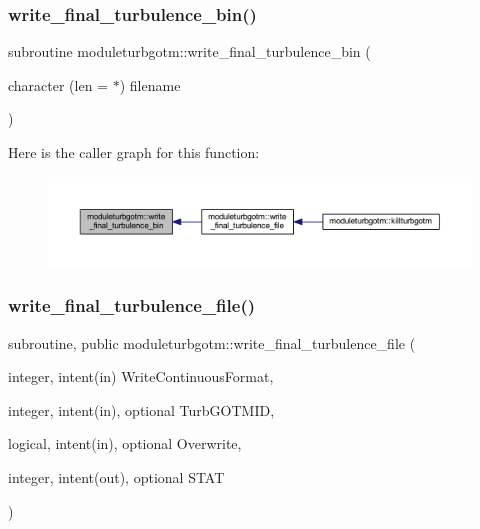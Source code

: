 \subsubsection{\texorpdfstring{write\+\_\+final\+\_\+turbulence\+\_\+bin()}{write\_final\_turbulence\_bin()}}
{\footnotesize\ttfamily subroutine moduleturbgotm\+::write\+\_\+final\+\_\+turbulence\+\_\+bin (\begin{DoxyParamCaption}\item[{character (len = $\ast$)}]{filename }\end{DoxyParamCaption})\hspace{0.3cm}{\ttfamily [private]}}

Here is the caller graph for this function\+:\nopagebreak
\begin{figure}[H]
\begin{center}
\leavevmode
\includegraphics[width=350pt]{namespacemoduleturbgotm_a471003d8ec76b83e26d91b8ed4815546_icgraph}
\end{center}
\end{figure}
\mbox{\label{namespacemoduleturbgotm_a01feda969236095bbd86a65a94f4e37c}} 
\subsubsection{\texorpdfstring{write\+\_\+final\+\_\+turbulence\+\_\+file()}{write\_final\_turbulence\_file()}}
{\footnotesize\ttfamily subroutine, public moduleturbgotm\+::write\+\_\+final\+\_\+turbulence\+\_\+file (\begin{DoxyParamCaption}\item[{integer, intent(in)}]{Write\+Continuous\+Format,  }\item[{integer, intent(in), optional}]{Turb\+G\+O\+T\+M\+ID,  }\item[{logical, intent(in), optional}]{Overwrite,  }\item[{integer, intent(out), optional}]{S\+T\+AT }\end{DoxyParamCaption})}


